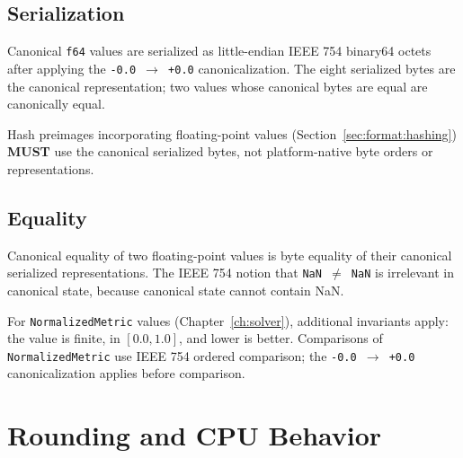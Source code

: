 \documentclass[11pt,letterpaper]{report}
\newcounter{requirement}[chapter]
\newcommand{\MUST}{\textbf{MUST}}
\begin{document}
\subsection{Serialization}

\begin{requirement}
  \label{req:determinism:floating-point-serialization}
  Canonical \texttt{f64} values are serialized as little-endian
  IEEE 754 binary64 octets after applying the
  \texttt{-0.0 $\to$ +0.0} canonicalization. The eight serialized
  bytes are the canonical representation; two values whose
  canonical bytes are equal are canonically equal.

  Hash preimages incorporating floating-point values
  (Section~\ref{sec:format:hashing}) \MUST{} use the canonical
  serialized bytes, not platform-native byte orders or
  representations.
\end{requirement}

\subsection{Equality}

\begin{requirement}
  \label{req:determinism:floating-point-equality}
  Canonical equality of two floating-point values is byte equality
  of their canonical serialized representations. The IEEE 754
  notion that \texttt{NaN $\ne$ NaN} is irrelevant in canonical
  state, because canonical state cannot contain NaN.

  For \texttt{NormalizedMetric} values
  (Chapter~\ref{ch:solver}), additional invariants apply: the
  value is finite, in $[0.0, 1.0]$, and lower is better.
  Comparisons of \texttt{NormalizedMetric} use IEEE 754 ordered
  comparison; the \texttt{-0.0 $\to$ +0.0} canonicalization
  applies before comparison.
\end{requirement}

\section{Rounding and CPU Behavior}
\label{sec:det:rounding}
\end{document}
